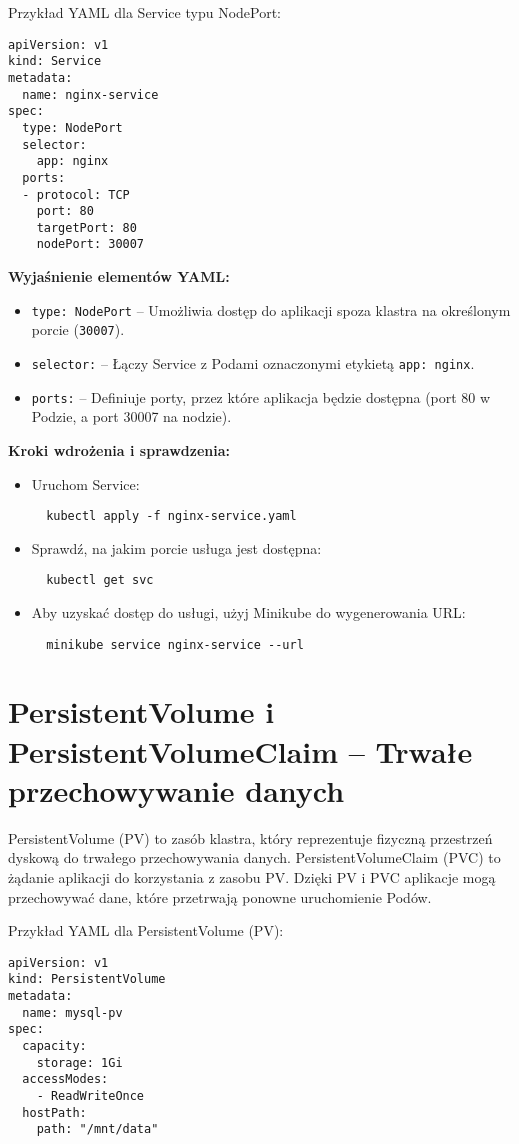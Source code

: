 \documentclass{article}
\begin{document}
Przykład YAML dla Service typu NodePort:
\begin{lstlisting}
apiVersion: v1
kind: Service
metadata:
  name: nginx-service
spec:
  type: NodePort
  selector:
    app: nginx
  ports:
  - protocol: TCP
    port: 80
    targetPort: 80
    nodePort: 30007
\end{lstlisting}

\textbf{Wyjaśnienie elementów YAML:}
\begin{itemize}
  \item \texttt{type: NodePort} – Umożliwia dostęp do aplikacji spoza klastra na określonym porcie (\texttt{30007}).
  \item \texttt{selector:} – Łączy Service z Podami oznaczonymi etykietą \texttt{app: nginx}.
  \item \texttt{ports:} – Definiuje porty, przez które aplikacja będzie dostępna (port 80 w Podzie, a port 30007 na nodzie).
\end{itemize}

\textbf{Kroki wdrożenia i sprawdzenia:}
\begin{itemize}
  \item Uruchom Service:
  \begin{lstlisting}
  kubectl apply -f nginx-service.yaml
  \end{lstlisting}
  \item Sprawdź, na jakim porcie usługa jest dostępna:
  \begin{lstlisting}
  kubectl get svc
  \end{lstlisting}
    \item Aby uzyskać dostęp do usługi, użyj Minikube do wygenerowania URL:
  \begin{lstlisting}
  minikube service nginx-service --url
  \end{lstlisting}
\end{itemize}

\section{PersistentVolume i PersistentVolumeClaim – Trwałe przechowywanie danych}

PersistentVolume (PV) to zasób klastra, który reprezentuje fizyczną przestrzeń dyskową do trwałego przechowywania danych. PersistentVolumeClaim (PVC) to żądanie aplikacji do korzystania z zasobu PV. Dzięki PV i PVC aplikacje mogą przechowywać dane, które przetrwają ponowne uruchomienie Podów.

Przykład YAML dla PersistentVolume (PV):
\begin{lstlisting}
apiVersion: v1
kind: PersistentVolume
metadata:
  name: mysql-pv
spec:
  capacity:
    storage: 1Gi
  accessModes:
    - ReadWriteOnce
  hostPath:
    path: "/mnt/data"
\end{lstlisting}
\end{document}
